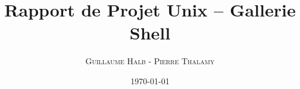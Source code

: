 \documentclass{article}
\title{Rapport de Projet Unix -- Gallerie Shell}
\author{\textsc{Guillaume Halb} - \textsc{Pierre Thalamy}}
\date{\today}
\begin{document}
\maketitle

\section{}
\end{document}
